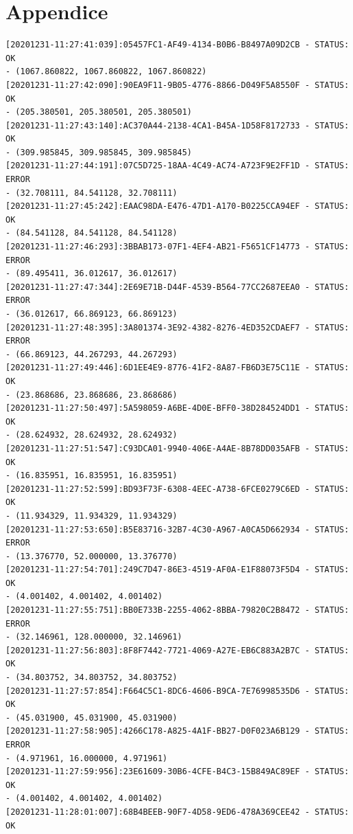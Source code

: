 \documentclass[11pt, oneside]{article}   	%
\begin{document}
\section{Appendice}
\begin{Verbatim}[frame=topline,
			framesep=4mm,
			label=\fbox{\Large{STATUS\_20201231.log}}]
[20201231-11:27:41:039]:05457FC1-AF49-4134-B0B6-B8497A09D2CB - STATUS: OK        
- (1067.860822, 1067.860822, 1067.860822)
[20201231-11:27:42:090]:90EA9F11-9B05-4776-8866-D049F5A8550F - STATUS: OK        
- (205.380501, 205.380501, 205.380501)
[20201231-11:27:43:140]:AC370A44-2138-4CA1-B45A-1D58F8172733 - STATUS: OK        
- (309.985845, 309.985845, 309.985845)
[20201231-11:27:44:191]:07C5D725-18AA-4C49-AC74-A723F9E2FF1D - STATUS: ERROR     
- (32.708111, 84.541128, 32.708111)
[20201231-11:27:45:242]:EAAC98DA-E476-47D1-A170-B0225CCA94EF - STATUS: OK        
- (84.541128, 84.541128, 84.541128)
[20201231-11:27:46:293]:3BBAB173-07F1-4EF4-AB21-F5651CF14773 - STATUS: ERROR     
- (89.495411, 36.012617, 36.012617)
[20201231-11:27:47:344]:2E69E71B-D44F-4539-B564-77CC2687EEA0 - STATUS: ERROR     
- (36.012617, 66.869123, 66.869123)
[20201231-11:27:48:395]:3A801374-3E92-4382-8276-4ED352CDAEF7 - STATUS: ERROR     
- (66.869123, 44.267293, 44.267293)
[20201231-11:27:49:446]:6D1EE4E9-8776-41F2-8A87-FB6D3E75C11E - STATUS: OK        
- (23.868686, 23.868686, 23.868686)
[20201231-11:27:50:497]:5A598059-A6BE-4D0E-BFF0-38D284524DD1 - STATUS: OK        
- (28.624932, 28.624932, 28.624932)
[20201231-11:27:51:547]:C93DCA01-9940-406E-A4AE-8B78DD035AFB - STATUS: OK        
- (16.835951, 16.835951, 16.835951)
[20201231-11:27:52:599]:BD93F73F-6308-4EEC-A738-6FCE0279C6ED - STATUS: OK        
- (11.934329, 11.934329, 11.934329)
[20201231-11:27:53:650]:B5E83716-32B7-4C30-A967-A0CA5D662934 - STATUS: ERROR     
- (13.376770, 52.000000, 13.376770)
[20201231-11:27:54:701]:249C7D47-86E3-4519-AF0A-E1F88073F5D4 - STATUS: OK        
- (4.001402, 4.001402, 4.001402)
[20201231-11:27:55:751]:BB0E733B-2255-4062-8BBA-79820C2B8472 - STATUS: ERROR     
- (32.146961, 128.000000, 32.146961)
[20201231-11:27:56:803]:8F8F7442-7721-4069-A27E-EB6C883A2B7C - STATUS: OK        
- (34.803752, 34.803752, 34.803752)
[20201231-11:27:57:854]:F664C5C1-8DC6-4606-B9CA-7E76998535D6 - STATUS: OK        
- (45.031900, 45.031900, 45.031900)
[20201231-11:27:58:905]:4266C178-A825-4A1F-BB27-D0F023A6B129 - STATUS: ERROR     
- (4.971961, 16.000000, 4.971961)
[20201231-11:27:59:956]:23E61609-30B6-4CFE-B4C3-15B849AC89EF - STATUS: OK        
- (4.001402, 4.001402, 4.001402)
[20201231-11:28:01:007]:68B4BEEB-90F7-4D58-9ED6-478A369CEE42 - STATUS: OK        

\end{Verbatim}
\end{document}
